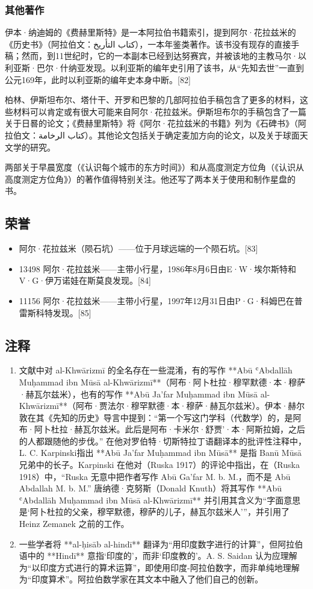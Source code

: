 \subsubsection{其他著作}  
伊本·纳迪姆的《费赫里斯特》是一本阿拉伯书籍索引，提到阿尔·花拉兹米的《历史书》（阿拉伯文：كتاب التأريخ），一本年鉴类著作。该书没有现存的直接手稿；然而，到11世纪时，它的一本副本已经到达努赛宾，并被该地的主教马尔·以利亚斯·巴尔·什纳亚发现。以利亚斯的编年史引用了该书，从“先知去世”一直到公元169年，此时以利亚斯的编年史本身中断。[82]

柏林、伊斯坦布尔、塔什干、开罗和巴黎的几部阿拉伯手稿包含了更多的材料，这些材料可以肯定或有很大可能来自阿尔·花拉兹米。伊斯坦布尔的手稿包含了一篇关于日晷的论文；《费赫里斯特》将《阿尔·花拉兹米的书籍》列为《石碑书》（阿拉伯文：كتاب الرخامة）。其他论文包括关于确定麦加方向的论文，以及关于球面天文学的研究。

两部关于早晨宽度（《认识每个城市的东方时间》）和从高度测定方位角（《认识从高度测定方位角》）的著作值得特别关注。他还写了两本关于使用和制作星盘的书。
\subsection{荣誉}
\begin{itemize}
\item 阿尔·花拉兹米（陨石坑）——位于月球远端的一个陨石坑。[83]  
\item 13498 阿尔·花拉兹米——主带小行星，1986年8月6日由E·W·埃尔斯特和V·G·伊万诺娃在斯莫良发现。[84]  
\item 11156 阿尔·花拉兹米——主带小行星，1997年12月31日由P·G·科姆巴在普雷斯科特发现。[85]
\end{itemize}
\subsection{注释}  
\begin{enumerate}
\item 文献中对 al-Khwārizmī 的全名存在一些混淆，有的写作 **Abū ʿAbdallāh Muḥammad ibn Mūsā al-Khwārizmī**（阿布·阿卜杜拉·穆罕默德·本·穆萨·赫瓦尔兹米），也有的写作 **Abū Ja'far Muḥammad ibn Mūsā al-Khwārizmī**（阿布·贾法尔·穆罕默德·本·穆萨·赫瓦尔兹米）。伊本·赫尔敦在其《先知的历史》导言中提到：“第一个写这门学科（代数学）的，是阿布·阿卜杜拉·赫瓦尔兹米。此后是阿布·卡米尔·舒贾'·本·阿斯拉姆，之后的人都跟随他的步伐。”  
在他对罗伯特·切斯特拉丁语翻译本的批评性注释中，L. C. Karpinski指出 **Abū Ja'far Muḥammad ibn Mūsā** 是指 Banū Mūsā 兄弟中的长子。Karpinski 在他对（Ruska 1917）的评论中指出，在（Ruska 1918）中，“Ruska 无意中把作者写作 Abū Ga'far M. b. M.，而不是 Abū Abdallah M. b. M.”  
唐纳德·克努斯（Donald Knuth）将其写作 **Abū ʿAbdallāh Muḥammad ibn Mūsā al-Khwārizmī** 并引用其含义为“字面意思是‘阿卜杜拉的父亲，穆罕默德，穆萨的儿子，赫瓦尔兹米人’”，并引用了 Heinz Zemanek 之前的工作。  
\item 一些学者将 **al-ḥisāb al-hindī** 翻译为“用印度数字进行的计算”，但阿拉伯语中的 **Hindī** 意指‘印度的’，而非‘印度教的’。A. S. Saidan 认为应理解为“以印度方式进行的算术运算”，即使用印度-阿拉伯数字，而非单纯地理解为“印度算术”。阿拉伯数学家在其文本中融入了他们自己的创新。
\end{enumerate}
